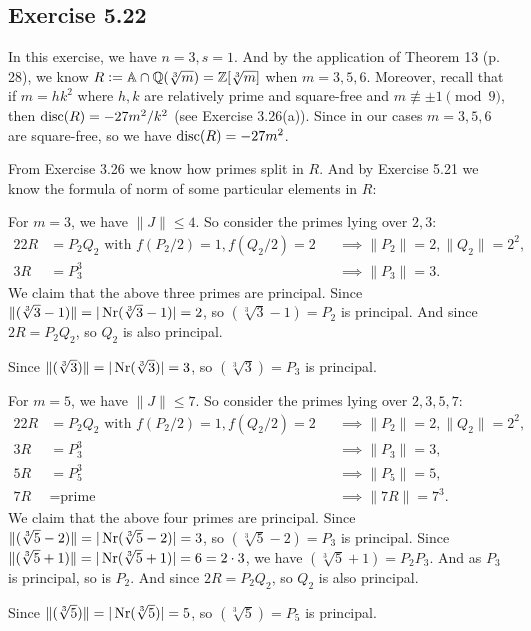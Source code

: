\documentclass[../Marcus.tex]{subfiles}
\begin{document}
\subsection*{Exercise 5.22}

In this exercise, we have $n=3,s=1$. And by the application of Theorem 13 (p. 28), we know $R := \mathbb{A} \cap \mathbb{Q}(\sqrt[3]{m}) = \mathbb{Z}[\sqrt[3]{m}]$ when $m=3,5,6$. Moreover, recall that if $m = hk^2$ where $h, k$ are relatively prime and square-free and $m \not\equiv \pm1 \pmod{9}$, then $\operatorname{disc}(R) = -27m^2/k^2$ (see Exercise 3.26(a)). Since in our cases $m=3,5,6$ are square-free, so we have $\operatorname{disc}(R) = -27m^2$.

From Exercise 3.26 we know how primes split in $R$. And by Exercise 5.21 we know the formula of norm of some particular elements in $R$:

For $m=3$, we have $\|J\| \leq 4$. So consider the primes lying over $2,3$:
\begin{alignat*}{2}
2R &= P_2Q_2 \text{ with } f(P_2/2) = 1, f(Q_2/2) = 2 &&\implies \|P_2\| = 2, \|Q_2\| = 2^2,    \\
3R &= P_3^3 &&\implies \|P_3\| = 3.
\end{alignat*}
We claim that the above three primes are principal. Since $\|(\sqrt[3]{3}-1)\| = |\operatorname{Nr}(\sqrt[3]{3}-1)| = 2$, so $(\sqrt[3]{3}-1) = P_2$ is principal. And since $2R = P_2Q_2$, so $Q_2$ is also principal.

Since $\|(\sqrt[3]{3})\| = |\operatorname{Nr}(\sqrt[3]{3})| = 3$, so $(\sqrt[3]{3}) = P_3$ is principal.

For $m=5$, we have $\|J\| \leq 7$. So consider the primes lying over $2,3,5,7$:
\begin{alignat*}{2}
2R &= P_2Q_2 \text{ with } f(P_2/2) = 1, f(Q_2/2) = 2 &&\implies \|P_2\| = 2, \|Q_2\| = 2^2,    \\
3R &= P_3^3 &&\implies \|P_3\| = 3,    \\
5R &= P_5^3 &&\implies \|P_5\| = 5,    \\
7R &= \text{prime} &&\implies \|7R\| = 7^3.
\end{alignat*}
We claim that the above four primes are principal. Since $\|(\sqrt[3]{5}-2)\| = |\operatorname{Nr}(\sqrt[3]{5}-2)| = 3$, so $(\sqrt[3]{5}-2) = P_3$ is principal. Since $\|(\sqrt[3]{5}+1)\| = |\operatorname{Nr}(\sqrt[3]{5}+1)| = 6 = 2\cdot 3$, we have $(\sqrt[3]{5}+1) = P_2P_3$. And as $P_3$ is principal, so is $P_2$. And since $2R = P_2Q_2$, so $Q_2$ is also principal.

Since $\|(\sqrt[3]{5})\| = |\operatorname{Nr}(\sqrt[3]{5})| = 5$, so $(\sqrt[3]{5}) = P_5$ is principal.
\end{document}
